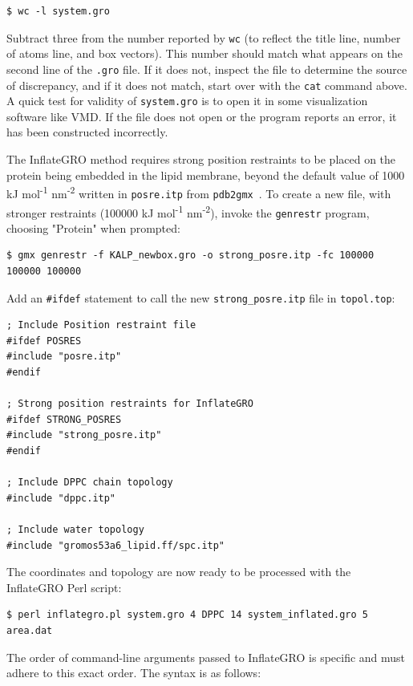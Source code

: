 \documentclass[9pt,tutorial,pubversion]{livecoms}
\begin{document}
\begin{lstlisting}
$ wc -l system.gro
\end{lstlisting}
%
Subtract three from the number reported by \texttt{wc} (to reflect the title line, number of atoms line, and box vectors). This number should match what appears on the second line of the \texttt{.gro} file. If it does not, inspect the file to determine the source of discrepancy, and if it does not match, start over with the \texttt{cat} command above. A quick test for validity of \texttt{system.gro} is to open it in some visualization software like VMD. If the file does not open or the program reports an error, it has been constructed incorrectly.

The InflateGRO method requires strong position restraints to be placed on the protein being embedded in the lipid membrane, beyond the default value of 1000 kJ mol\textsuperscript{-1} nm\textsuperscript{-2} written in \texttt{posre.itp} from \texttt{pdb2gmx}~\cite{Kandt2007}. To create a new file, with stronger restraints (100000 kJ mol\textsuperscript{-1} nm\textsuperscript{-2}), invoke the \texttt{genrestr} program, choosing "Protein" when prompted:

\begin{lstlisting}
$ gmx genrestr -f KALP_newbox.gro -o strong_posre.itp -fc 100000 100000 100000
\end{lstlisting}

Add an \texttt{\#ifdef} statement to call the new \texttt{strong\_posre.itp} file in \texttt{topol.top}:

\begin{lstlisting}
; Include Position restraint file
#ifdef POSRES
#include "posre.itp"
#endif

; Strong position restraints for InflateGRO
#ifdef STRONG_POSRES
#include "strong_posre.itp"
#endif

; Include DPPC chain topology
#include "dppc.itp"

; Include water topology
#include "gromos53a6_lipid.ff/spc.itp"
\end{lstlisting}

The coordinates and topology are now ready to be processed with the InflateGRO Perl script:

\begin{lstlisting}
$ perl inflategro.pl system.gro 4 DPPC 14 system_inflated.gro 5 area.dat
\end{lstlisting}
%
The order of command-line arguments passed to InflateGRO is specific and must adhere to this exact order. The syntax is as follows:
\end{document}
